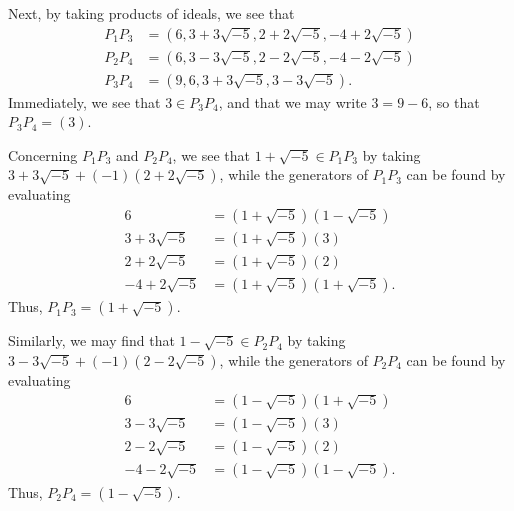 \documentclass[10pt]{mypackage}
\begin{document}
\begin{solution}
\begin{enumerate}[(a)]
      Next, by taking products of ideals, we see that
      \begin{align*}
        P_1P_3 &= \left( 6,3+3\sqrt{-5},2+2\sqrt{-5},-4+2\sqrt{-5} \right)\\
        P_2P_4 &= \left( 6,3-3\sqrt{-5},2-2\sqrt{-5},-4-2\sqrt{-5} \right)\\
        P_3P_4 &= \left( 9,6,3+3\sqrt{-5},3-3\sqrt{-5} \right).
      \end{align*}
      Immediately, we see that $3\in P_3P_4$, and that we may write $3 = 9-6$, so that $P_3P_4 = \left( 3 \right)$.\newline

      Concerning $P_1P_3$ and $P_2P_4$, we see that $1 + \sqrt{-5}\in P_1P_3$ by taking $3 + 3\sqrt{-5} + \left( -1 \right)\left( 2 + 2\sqrt{-5} \right)$, while the generators of $P_1P_3$ can be found by evaluating
      \begin{align*}
        6 &= \left( 1+\sqrt{-5} \right)\left( 1-\sqrt{-5} \right)\\
        3 + 3\sqrt{-5} &= \left( 1 + \sqrt{-5} \right)\left( 3 \right)\\
        2 + 2\sqrt{-5} &= \left( 1 + \sqrt{-5} \right)\left( 2 \right)\\
        -4 + 2\sqrt{-5} &= \left( 1+\sqrt{-5} \right)\left( 1 + \sqrt{-5} \right).
      \end{align*}
      Thus, $P_1P_3 = \left( 1 + \sqrt{-5} \right)$.\newline

      Similarly, we may find that $1 - \sqrt{-5}\in P_2P_4$ by taking $ 3 - 3\sqrt{-5} + \left( -1 \right)\left( 2-2\sqrt{-5} \right) $, while the generators of $P_2P_4$ can be found by evaluating
      \begin{align*}
        6 &= \left( 1-\sqrt{-5} \right)\left( 1 + \sqrt{-5} \right)\\
        3 - 3\sqrt{-5} &= \left( 1-\sqrt{-5} \right)\left( 3 \right)\\
        2-2\sqrt{-5} &= \left( 1-\sqrt{-5} \right)\left( 2 \right)\\
        -4-2\sqrt{-5} &= \left( 1-\sqrt{-5} \right)\left( 1-\sqrt{-5} \right).
      \end{align*}
      Thus, $P_2P_4 = \left( 1-\sqrt{-5} \right)$.
  \end{enumerate}
\end{solution}
\end{document}
